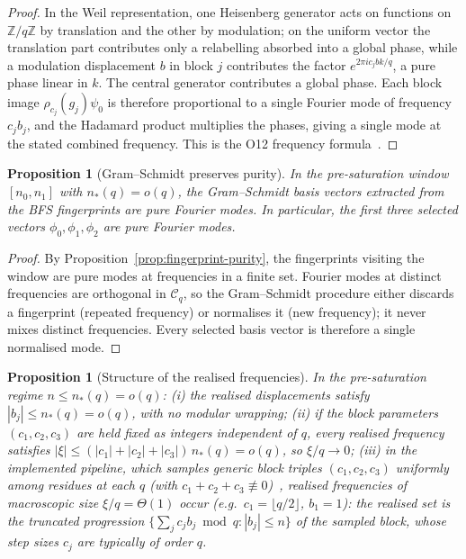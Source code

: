 \documentclass[11pt,a4paper]{article}
\theoremstyle{plain}
\newtheorem{proposition}[theorem]{Proposition}
\theoremstyle{definition}
\newcommand{\Z}{\mathbb{Z}}
\newcommand{\Cq}{\mathcal{C}_q}
\begin{document}
  \begin{proof}
    In the Weil representation, one Heisenberg generator acts on functions on $\Z/q\Z$ by
    translation and the other by modulation; on the uniform vector the translation part
    contributes only a relabelling absorbed into a global phase, while a modulation
    displacement $b$ in block $j$ contributes the factor $e^{2\pi i c_j b k/q}$, a pure
    phase linear in $k$.
    The central generator contributes a global phase.
    Each block image $\rho_{c_j}(g_j)\psi_0$ is therefore proportional to a single Fourier
    mode of frequency $c_j b_j$, and the Hadamard product multiplies the phases, giving a
    single mode at the stated combined frequency.
    This is the O12 frequency formula~\cite{Beau2026a16}.
  \end{proof}

  \begin{proposition}[Gram--Schmidt preserves purity]
    \label{prop:gs-purity}
    In the pre-saturation window $[n_0, n_1]$ with $n_*(q) = o(q)$, the Gram--Schmidt
    basis vectors extracted from the BFS fingerprints are pure Fourier modes.
    In particular, the first three selected vectors $\phi_0, \phi_1, \phi_2$ are pure
    Fourier modes.
  \end{proposition}

  \begin{proof}
    By Proposition~\ref{prop:fingerprint-purity}, the fingerprints visiting the window
    are pure modes at frequencies in a finite set.
    Fourier modes at distinct frequencies are orthogonal in $\Cq$, so the Gram--Schmidt
    procedure either discards a fingerprint (repeated frequency) or normalises it
    (new frequency); it never mixes distinct frequencies.
    Every selected basis vector is therefore a single normalised mode.
  \end{proof}

  \begin{proposition}[Structure of the realised frequencies]
    \label{prop:small-frequencies}
    In the pre-saturation regime $n \le n_*(q) = o(q)$:
    (i) the realised displacements satisfy $|b_j| \le n_*(q) = o(q)$, with no modular
    wrapping;
    (ii) if the block parameters $(c_1, c_2, c_3)$ are held fixed as integers independent
    of $q$, every realised frequency satisfies
    $|\xi| \le (|c_1|+|c_2|+|c_3|)\, n_*(q) = o(q)$, so $\xi/q \to 0$;
    (iii) in the implemented pipeline, which samples generic block triples
    $(c_1,c_2,c_3)$ uniformly among residues at each $q$ (with
    $c_1 + c_2 + c_3 \not\equiv 0$)~\cite{Beau2026a16,Beau2026a29}, realised frequencies
    of macroscopic size $\xi/q = \Theta(1)$ occur (e.g.\ $c_1 = \lfloor q/2 \rfloor$,
    $b_1 = 1$): the realised set is the truncated progression
    $\{\sum_j c_j b_j \bmod q : |b_j| \le n\}$ of the sampled block, whose step sizes
    $c_j$ are typically of order $q$.
  \end{proposition}
\end{document}
